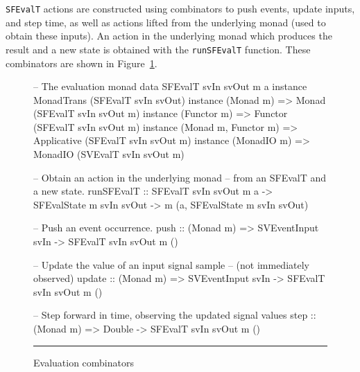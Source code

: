 {\tt SFEvalT} actions are constructed using combinators to push events,
update inputs, and step time, as well as actions lifted from the underlying
monad (used to obtain these inputs). An action in the underlying monad
which produces the result and a new state is obtained with the {\tt runSFEvalT}
function. These combinators are shown in Figure~\ref{figure:evaluation_combinators}.

\begin{figure}
\begin{code}
-- The evaluation monad
data SFEvalT svIn svOut m a
instance MonadTrans (SFEvalT svIn svOut)
instance (Monad m) => Monad (SFEvalT svIn svOut m)
instance (Functor m) => Functor (SFEvalT svIn svOut m)
instance (Monad m, Functor m) => Applicative (SFEvalT svIn svOut m)
instance (MonadIO m) => MonadIO (SVEvalT svIn svOut m)

-- Obtain an action in the underlying monad
-- from an SFEvalT and a new state.
runSFEvalT ::    SFEvalT svIn svOut m a
              -> SFEvalState m svIn svOut
              -> m (a, SFEvalState m svIn svOut)

-- Push an event occurrence.
push :: (Monad m) => SVEventInput svIn -> SFEvalT svIn svOut m ()

-- Update the value of an input signal sample
-- (not immediately observed)
update :: (Monad m) => SVEventInput svIn -> SFEvalT svIn svOut m ()

-- Step forward in time, observing the updated signal values
step :: (Monad m) => Double -> SFEvalT svIn svOut m ()
\end{code}
\hrule
\caption{Evaluation combinators}
\label{figure:evaluation_combinators}
\end{figure}

